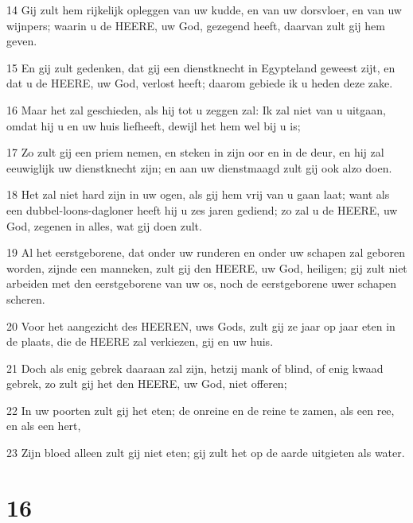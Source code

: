 \par 14 Gij zult hem rijkelijk opleggen van uw kudde, en van uw dorsvloer, en van uw wijnpers; waarin u de HEERE, uw God, gezegend heeft, daarvan zult gij hem geven.
\par 15 En gij zult gedenken, dat gij een dienstknecht in Egypteland geweest zijt, en dat u de HEERE, uw God, verlost heeft; daarom gebiede ik u heden deze zake.
\par 16 Maar het zal geschieden, als hij tot u zeggen zal: Ik zal niet van u uitgaan, omdat hij u en uw huis liefheeft, dewijl het hem wel bij u is;
\par 17 Zo zult gij een priem nemen, en steken in zijn oor en in de deur, en hij zal eeuwiglijk uw dienstknecht zijn; en aan uw dienstmaagd zult gij ook alzo doen.
\par 18 Het zal niet hard zijn in uw ogen, als gij hem vrij van u gaan laat; want als een dubbel-loons-dagloner heeft hij u zes jaren gediend; zo zal u de HEERE, uw God, zegenen in alles, wat gij doen zult.
\par 19 Al het eerstgeborene, dat onder uw runderen en onder uw schapen zal geboren worden, zijnde een manneken, zult gij den HEERE, uw God, heiligen; gij zult niet arbeiden met den eerstgeborene van uw os, noch de eerstgeborene uwer schapen scheren.
\par 20 Voor het aangezicht des HEEREN, uws Gods, zult gij ze jaar op jaar eten in de plaats, die de HEERE zal verkiezen, gij en uw huis.
\par 21 Doch als enig gebrek daaraan zal zijn, hetzij mank of blind, of enig kwaad gebrek, zo zult gij het den HEERE, uw God, niet offeren;
\par 22 In uw poorten zult gij het eten; de onreine en de reine te zamen, als een ree, en als een hert,
\par 23 Zijn bloed alleen zult gij niet eten; gij zult het op de aarde uitgieten als water.

\chapter{16}


